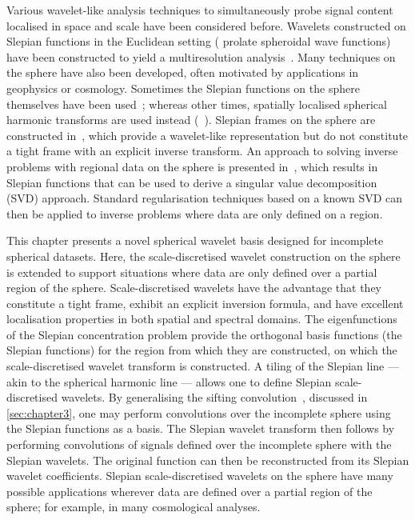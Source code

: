 Various wavelet-like analysis techniques to simultaneously probe signal content localised in space and scale have been considered before.
Wavelets constructed on Slepian functions in the Euclidean setting (\ie{} prolate spheroidal wave functions) have been constructed to yield a multiresolution analysis~\cite{Walter2004}.
Many techniques on the sphere have also been developed, often motivated by applications in geophysics or cosmology.
Sometimes the Slepian functions on the sphere themselves have been used~\cite{Simons2009}; whereas other times, spatially localised spherical harmonic transforms are used instead (\eg{}~\cite{Simons1997,Wieczorek2005,Khalid2013,Khalid2013a}).
Slepian frames on the sphere are constructed in~\cite{Simons2011}, which provide a wavelet-like representation but do not constitute a tight frame with an explicit inverse transform.
An approach to solving inverse problems with regional data on the sphere is presented in~\cite{Michel2017}, which results in Slepian functions that can be used to derive a singular value decomposition (SVD) approach.
Standard regularisation techniques based on a known SVD can then be applied to inverse problems where data are only defined on a region.

This chapter presents a novel spherical wavelet basis designed for incomplete spherical datasets.
Here, the scale-discretised wavelet construction on the sphere~\cite{Wiaux2008,McEwen2018,Leistedt2013,McEwen2013,McEwen2015} is extended to support situations where data are only defined over a partial region of the sphere.
Scale-discretised wavelets have the advantage that they constitute a tight frame, exhibit an explicit inversion formula, and have excellent localisation properties in both spatial and spectral domains.
The eigenfunctions of the Slepian concentration problem provide the orthogonal basis functions (the Slepian functions) for the region from which they are constructed, on which the scale-discretised wavelet transform is constructed.
A tiling of the Slepian line --- akin to the spherical harmonic line --- allows one to define Slepian scale-discretised wavelets.
By generalising the sifting convolution~\cite{Roddy2021}, discussed in \cref{sec:chapter3}, one may perform convolutions over the incomplete sphere using the Slepian functions as a basis.
The Slepian wavelet transform then follows by performing convolutions of signals defined over the incomplete sphere with the Slepian wavelets.
The original function can then be reconstructed from its Slepian wavelet coefficients.
Slepian scale-discretised wavelets on the sphere have many possible applications wherever data are defined over a partial region of the sphere; for example, in many cosmological analyses.


